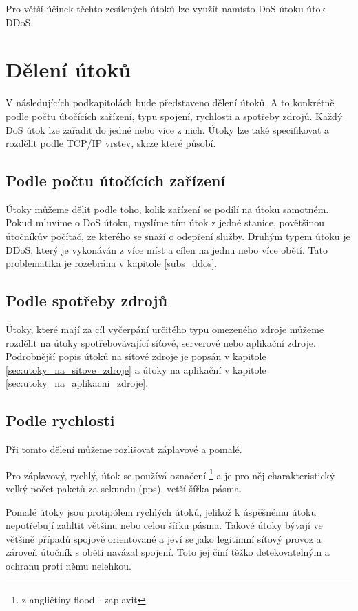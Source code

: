 Pro větší účinek těchto zesílených útoků lze využít namísto DoS útoku útok DDoS.

\section{Dělení útoků}
V následujících podkapitolách bude představeno dělení útoků. A to konkrétně podle počtu útočících zařízení, typu spojení, rychlosti a spotřeby zdrojů. Každý DoS útok lze zařadit do jedné nebo více z nich.
Útoky lze také specifikovat a rozdělit podle TCP/IP vrstev, skrze které působí.

\subsection{Podle počtu útočících zařízení}
Útoky můžeme dělit podle toho, kolik zařízení se podílí na útoku samotném. Pokud mluvíme o DoS útoku, myslíme tím útok z jedné stanice, povětšinou útočníkův počítač, ze kterého se snaží o odepření služby.
Druhým typem útoku je DDoS, který je vykonáván z více míst a cílen na jednu nebo více obětí.
Tato problematika je rozebrána v kapitole \ref{subs_ddos}.


\subsection{Podle spotřeby zdrojů}
Útoky, které mají za cíl vyčerpání určitého typu omezeného zdroje můžeme rozdělit na útoky spotřebovávající síťové, serverové nebo aplikační zdroje.
Podrobnější popis útoků na síťové zdroje je popsán v kapitole \ref{sec:utoky_na_sitove_zdroje} a útoky na aplikační v kapitole \ref{sec:utoky_na_aplikacni_zdroje}.


\subsection{Podle rychlosti}
Při tomto dělení můžeme rozlišovat záplavové a pomalé. 

Pro záplavový, rychlý, útok se používá označení \footnote{z angličtiny flood - zaplavit} a je pro něj charakteristický velký počet paketů za sekundu (pps), vetší šířka pásma. 

Pomalé útoky jsou protipólem rychlých útoků, jelikož k úspěšnému útoku nepotřebují zahltit většinu nebo celou šířku pásma. Takové útoky bývají ve většině případů spojově orientované a jeví se jako legitimní síťový provoz a zároveň útočník s obětí navázal spojení. Toto jej činí těžko detekovatelným a ochranu proti němu nelehkou.

